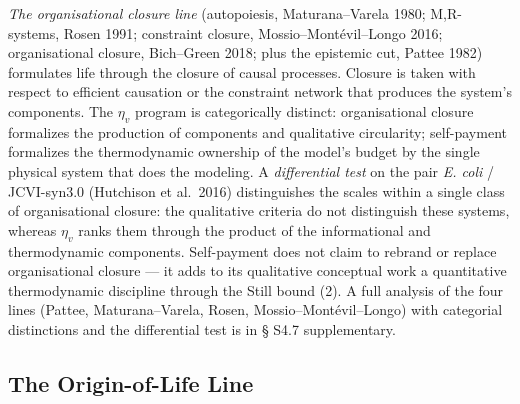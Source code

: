 \documentclass[pdflatex,sn-mathphys-ay]{sn-jnl}
\begin{document}
\emph{The organisational closure line} (autopoiesis, Maturana--Varela 1980; M,R-systems, Rosen 1991; constraint closure, Mossio--Montévil--Longo 2016; organisational closure, Bich--Green 2018; plus the epistemic cut, Pattee 1982) formulates life through the closure of causal processes. Closure is taken with respect to efficient causation or the constraint network that produces the system's components. The \(\eta_v\) program is categorically distinct: organisational closure formalizes the production of components and qualitative circularity; self-payment formalizes the thermodynamic ownership of the model's budget by the single physical system that does the modeling. A \emph{differential test} on the pair \emph{E. coli} / JCVI-syn3.0 (Hutchison et al.~2016) distinguishes the scales within a single class of organisational closure: the qualitative criteria do not distinguish these systems, whereas \(\eta_v\) ranks them through the product of the informational and thermodynamic components. Self-payment does not claim to rebrand or replace organisational closure --- it adds to its qualitative conceptual work a quantitative thermodynamic discipline through the Still bound (2). A full analysis of the four lines (Pattee, Maturana--Varela, Rosen, Mossio--Montévil--Longo) with categorial distinctions and the differential test is in § S4.7 supplementary.

\subsection{The Origin-of-Life Line}\label{the-origin-of-life-line}
\end{document}
